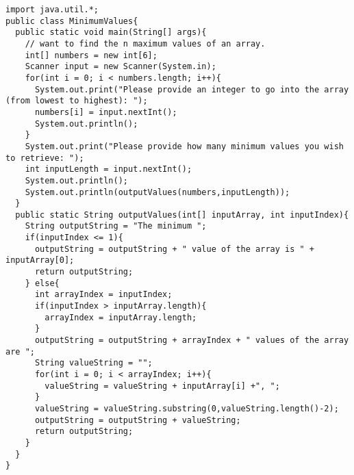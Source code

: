 \documentclass[10pt]{mypackage}
\begin{document}
  \begin{lstlisting}[style=javastyle,title=Finding the Minimum $n$ Values in an Array]
import java.util.*;
public class MinimumValues{
  public static void main(String[] args){
    // want to find the n maximum values of an array.
    int[] numbers = new int[6];
    Scanner input = new Scanner(System.in);
    for(int i = 0; i < numbers.length; i++){
      System.out.print("Please provide an integer to go into the array (from lowest to highest): ");
      numbers[i] = input.nextInt();
      System.out.println();
    }
    System.out.print("Please provide how many minimum values you wish to retrieve: ");
    int inputLength = input.nextInt();
    System.out.println();
    System.out.println(outputValues(numbers,inputLength));
  }
  public static String outputValues(int[] inputArray, int inputIndex){
    String outputString = "The minimum ";
    if(inputIndex <= 1){
      outputString = outputString + " value of the array is " + inputArray[0];
      return outputString;
    } else{
      int arrayIndex = inputIndex;
      if(inputIndex > inputArray.length){
        arrayIndex = inputArray.length;
      }
      outputString = outputString + arrayIndex + " values of the array are ";
      String valueString = "";
      for(int i = 0; i < arrayIndex; i++){
        valueString = valueString + inputArray[i] +", ";
      }
      valueString = valueString.substring(0,valueString.length()-2);
      outputString = outputString + valueString;
      return outputString;
    }
  }
}
  \end{lstlisting}
\end{document}

